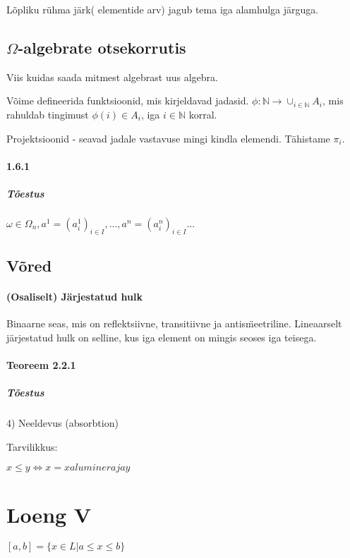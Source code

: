 \documentclass[12pt]{report}
\numberwithin{equation}{section}
\theoremstyle{definition}
\theoremstyle{plain}
\begin{document}
Lõpliku rühma järk( elementide arv) jagub tema iga alamhulga järguga.

\subsection{$\Omega$-algebrate otsekorrutis}

Viis kuidas saada mitmest algebrast uus algebra.

Võime defineerida funktsioonid, mis kirjeldavad jadasid. $ \phi : \mathbb{N} \rightarrow \cup_{i \in \mathbb{N}} A_i$, mis rahuldab tingimust $ \phi (i) \in A_i$, iga $i \in \mathbb{N}$ korral.

Projektsioonid - seavad jadale vastavuse mingi kindla elemendi. Tähistame $\pi _ i$. 

\paragraph{ 1.6.1}

\subparagraph{Tõestus}
$\omega \in \Omega_n, a^1 = (a_i^1)_{i \in I},..., a^n = (a_i^n)_{i \in I} ...$ 

\subsection{Võred}

\paragraph{(Osaliselt) Järjestatud hulk} 

Binaarne seas, mis on reflektsiivne, transitiivne ja antis\"meetriline. Lineaarselt järjestatud hulk on selline, kus iga element on mingis seoses iga teisega.

\paragraph{Teoreem 2.2.1}

\subparagraph{Tõestus}

4) Neeldevus (absorbtion)

Tarvilikkus:

$x \leq y \iff x = x alumineraja y$

\section{Loeng V}

$[a,b] = \{x \in L | a \leq x \leq b \}$
\end{document}
